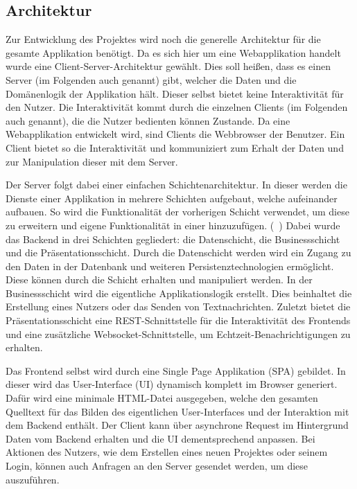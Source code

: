 \subsection{Architektur}

Zur Entwicklung des Projektes wird noch die generelle Architektur für die
gesamte Applikation benötigt. Da es sich hier um eine Webapplikation handelt
wurde eine Client-Server-Architektur gewählt. Dies soll heißen, dass es einen
Server (im Folgenden auch  genannt) gibt, welcher die Daten und
die Domänenlogik der Applikation hält. Dieser selbst bietet keine
Interaktivität für den Nutzer. Die Interaktivität kommt durch die einzelnen
Clients (im Folgenden auch  genannt), die die Nutzer bedienten
können Zustande. Da eine Webapplikation entwickelt wird, sind Clients die
Webbrowser der Benutzer. Ein Client bietet so die Interaktivität und
kommuniziert zum Erhalt der Daten und zur Manipulation dieser mit dem Server.

Der Server folgt dabei einer einfachen Schichtenarchitektur. In dieser werden
die Dienste einer Applikation in mehrere Schichten aufgebaut, welche aufeinander
aufbauen. So wird die Funktionalität der vorherigen Schicht verwendet, um diese
zu erweitern und eigene Funktionalität in einer hinzuzufügen.
(\vgl{}~\cite[\page{} 35]{layeredArch}) Dabei wurde das Backend in drei
Schichten gegliedert: die Datenschicht, die Businessschicht und die
Präsentationsschicht. Durch die Datenschicht werden wird ein Zugang zu den
Daten in der Datenbank und weiteren Persistenztechnologien ermöglicht.
Diese können durch die Schicht erhalten und manipuliert werden. In der Businessschicht
wird die eigentliche Applikationslogik erstellt. Dies beinhaltet \zb{} die Erstellung eines Nutzers
oder das Senden von Textnachrichten. Zuletzt bietet die Präsentationsschicht eine
REST-Schnittstelle für die Interaktivität des Frontends und eine zusätzliche Websocket-Schnittstelle,
um Echtzeit-Benachrichtigungen zu erhalten.

Das Frontend selbst wird durch eine Single Page Applikation (SPA) gebildet. In
dieser wird das User-Interface (UI) dynamisch komplett im Browser generiert.
Dafür wird eine minimale HTML-Datei ausgegeben, welche den gesamten Quelltext
für das Bilden des eigentlichen User-Interfaces und der Interaktion mit dem
Backend enthält. Der Client kann über asynchrone Request im Hintergrund Daten
vom Backend erhalten und die UI dementsprechend anpassen. Bei Aktionen des
Nutzers, wie \zb{} dem Erstellen eines neuen Projektes oder seinem Login,
können auch Anfragen an den Server gesendet werden, um diese auszuführen.

